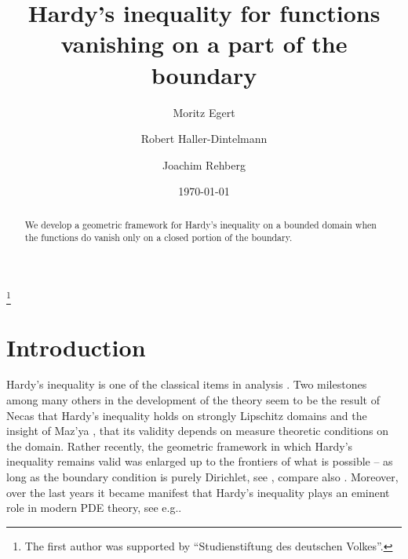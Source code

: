 \documentclass[10pt,leqno]{amsart}
\theoremstyle{definition}
\numberwithin{equation}{section}
\begin{document}
\title[Hardy's inequality]{Hardy's inequality for functions vanishing on a part
of the boundary}

\author{Moritz Egert}
\address{Technische Universit\"at Darmstadt, Fachbereich
Mathematik, Schlossgartenstr.\@ 7, D-64298 Darmstadt, Germany}

\author{Robert Haller-Dintelmann}
\address{Technische Universit\"at Darmstadt, Fachbereich
Mathematik, Schlossgartenstr.\@ 7, D-64298 Darmstadt, Germany}

\author{Joachim Rehberg}
\address{Weierstrass Institute for Applied Analysis and Stochastics,
 Mohrenstr.\@ 39, D-10117 Berlin, Germany}

\date{\today}
\thanks{The first author was supported by ``Studienstiftung des deutschen Volkes''.}

\begin{abstract}
We develop a geometric framework for Hardy's inequality on a bounded domain
when the functions do vanish only on a closed portion of the boundary.
\end{abstract}

\maketitle

\section{Introduction}

\noindent Hardy's inequality is one of the classical items in analysis 
\cite{kufner, opic}. Two milestones among many others in the development of
the theory seem to be the result of Necas \cite{necas} that Hardy's inequality
holds on strongly Lipschitz domains  and the insight of Maz'ya \cite{maz1960},
\cite[Ch.~2.3]{mazsob} that its validity depends on measure theoretic conditions
on the domain. Rather recently, the geometric framework in which Hardy's
inequality remains valid was enlarged up to the frontiers of what is possible --
as long as the boundary condition is purely Dirichlet, see  \cite{korte, juha},
compare also \cite{Anc,lewis,Wannebo}. Moreover, over the last years it became
manifest that Hardy's inequality plays an eminent role in modern PDE theory,
see e.g.\@ \cite{caza, vandenBerg, rakoto, aermark, ekholm, dambrosio, garcia,
kang, lisk, marcus}.
\end{document}
